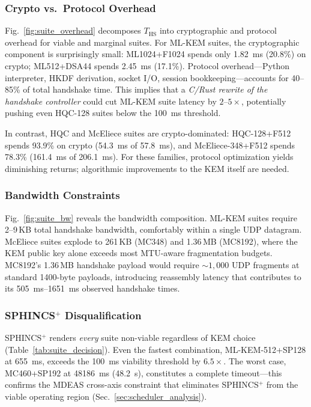 \subsubsection{Crypto vs.\ Protocol Overhead}
Fig.~\ref{fig:suite_overhead} decomposes $T_\text{HS}$ into
cryptographic and protocol overhead for viable and marginal suites.
For ML-KEM suites, the cryptographic component is surprisingly small:
ML1024+F1024 spends only \SI{1.82}{ms} (20.8\%) on crypto;
ML512+DSA44 spends \SI{2.45}{ms} (17.1\%).  Protocol overhead---Python
interpreter, HKDF derivation, socket I/O, session bookkeeping---accounts
for 40--85\% of total handshake time.  This implies that a
\emph{C/Rust rewrite of the handshake controller} could cut ML-KEM
suite latency by $2$--$5\times$, potentially pushing even HQC-128
suites below the \SI{100}{ms} threshold.

In contrast, HQC and McEliece suites are crypto-dominated: HQC-128+F512
spends 93.9\% on crypto (\SI{54.3}{ms} of \SI{57.8}{ms}), and
McEliece-348+F512 spends 78.3\% (\SI{161.4}{ms} of \SI{206.1}{ms}).
For these families, protocol optimization yields diminishing returns;
algorithmic improvements to the KEM itself are needed.

\subsubsection{Bandwidth Constraints}
Fig.~\ref{fig:suite_bw} reveals the bandwidth composition.  ML-KEM
suites require 2--9\,KB total handshake bandwidth, comfortably within
a single UDP datagram.  McEliece suites explode to
261\,KB (MC348) and 1.36\,MB (MC8192), where the KEM public key
alone exceeds most MTU-aware fragmentation budgets.  MC8192's
1.36\,MB handshake payload would require ${\sim}1{,}000$ UDP
fragments at standard 1400-byte payloads, introducing reassembly
latency that contributes to its \SI{505}{ms}--\SI{1651}{ms} observed
handshake times.

\subsubsection{SPHINCS$^+$ Disqualification}
SPHINCS$^+$ renders \emph{every} suite non-viable regardless of KEM
choice (Table~\ref{tab:suite_decision}).  Even the fastest combination,
ML-KEM-512+SP128 at \SI{655}{ms}, exceeds the \SI{100}{ms}
viability threshold by $6.5\times$.  The worst case, MC460+SP192 at
\SI{48186}{ms} (\SI{48.2}{s}), constitutes a complete timeout---this
confirms the MDEAS cross-axis constraint that eliminates SPHINCS$^+$
from the viable operating region (Sec.~\ref{sec:scheduler_analysis}).

